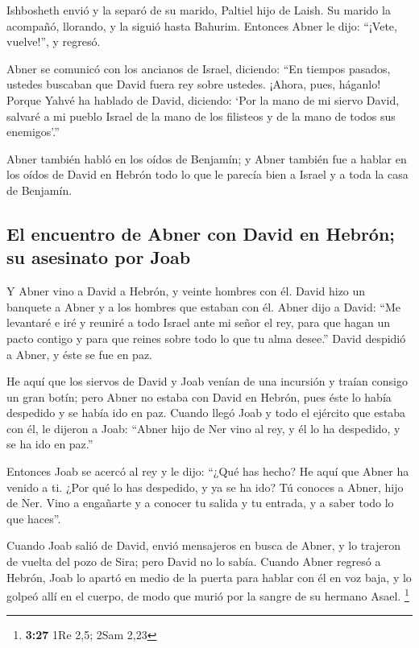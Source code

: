  Ishbosheth envió y la separó de su marido, Paltiel hijo
de Laish.  Su marido la acompañó, llorando, y la siguió
hasta Bahurim. Entonces Abner le dijo: ``¡Vete, vuelve!'', y regresó.

 Abner se comunicó con los ancianos de Israel, diciendo:
``En tiempos pasados, ustedes buscaban que David fuera rey sobre
ustedes.  ¡Ahora, pues, háganlo! Porque Yahvé ha hablado
de David, diciendo: `Por la mano de mi siervo David, salvaré a mi pueblo
Israel de la mano de los filisteos y de la mano de todos sus
enemigos'.''

 Abner también habló en los oídos de Benjamín; y Abner
también fue a hablar en los oídos de David en Hebrón todo lo que le
parecía bien a Israel y a toda la casa de Benjamín.

\hypertarget{el-encuentro-de-abner-con-david-en-hebruxf3n-su-asesinato-por-joab}{%
\subsection{El encuentro de Abner con David en Hebrón; su asesinato por
Joab}\label{el-encuentro-de-abner-con-david-en-hebruxf3n-su-asesinato-por-joab}}

 Y Abner vino a David a Hebrón, y veinte hombres con él.
David hizo un banquete a Abner y a los hombres que estaban con él.
 Abner dijo a David: ``Me levantaré e iré y reuniré a
todo Israel ante mi señor el rey, para que hagan un pacto contigo y para
que reines sobre todo lo que tu alma desee.'' David despidió a Abner, y
éste se fue en paz.

 He aquí que los siervos de David y Joab venían de una
incursión y traían consigo un gran botín; pero Abner no estaba con David
en Hebrón, pues éste lo había despedido y se había ido en paz.
 Cuando llegó Joab y todo el ejército que estaba con él,
le dijeron a Joab: ``Abner hijo de Ner vino al rey, y él lo ha
despedido, y se ha ido en paz.''

 Entonces Joab se acercó al rey y le dijo: ``¿Qué has
hecho? He aquí que Abner ha venido a ti. ¿Por qué lo has despedido, y ya
se ha ido?  Tú conoces a Abner, hijo de Ner. Vino a
engañarte y a conocer tu salida y tu entrada, y a saber todo lo que
haces''.

 Cuando Joab salió de David, envió mensajeros en busca de
Abner, y lo trajeron de vuelta del pozo de Sira; pero David no lo sabía.
 Cuando Abner regresó a Hebrón, Joab lo apartó en medio
de la puerta para hablar con él en voz baja, y lo golpeó allí en el
cuerpo, de modo que murió por la sangre de su hermano Asael. \footnote{\textbf{3:27}
  1Re 2,5; 2Sam 2,23}

